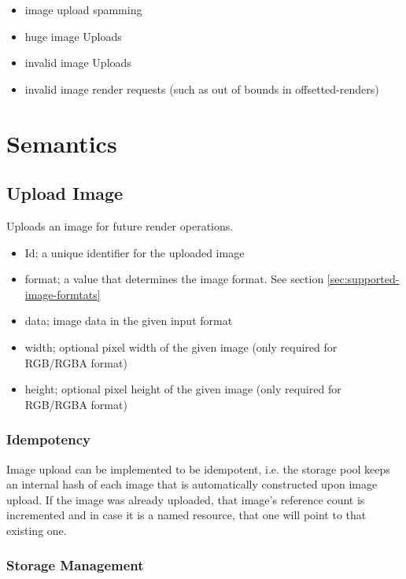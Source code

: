 \documentclass{article}
\begin{document}
\begin{itemize}
    \item image upload spamming
    \item huge image Uploads
    \item invalid image Uploads
    \item invalid image render requests (such as out of bounds in offsetted-renders)
\end{itemize}

\section{Semantics} %

\subsection{Upload Image}

Uploads an image for future render operations.

\begin{itemize}
    \item Id; a unique identifier for the uploaded image
    \item format; a value that determines the image format. See section \ref{sec:supported-image-formtats}
    \item data; image data in the given input format
    \item width; optional pixel width of the given image (only required for RGB/RGBA format)
    \item height; optional pixel height of the given image (only required for RGB/RGBA format)
\end{itemize}

\subsubsection{Idempotency}

Image upload can be implemented to be idempotent, i.e. the storage pool keeps an internal hash
of each image that is automatically constructed upon image upload.
If the image was already uploaded, that image's reference count is incremented
and in case it is a named resource, that one will point to that existing one.

\subsubsection{Storage Management}
\end{document}
